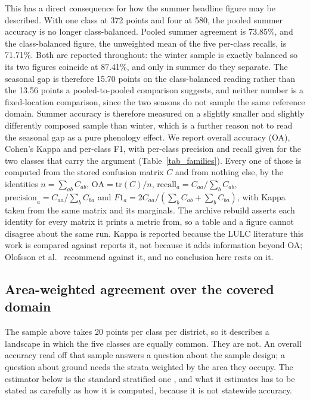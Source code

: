 \documentclass[conference]{IEEEtran}
\begin{document}
This has a direct consequence for how the summer headline figure may be described. With one class at 372 points and four at 580, the pooled summer accuracy is no longer class-balanced. Pooled summer agreement is 73.85\%, and the class-balanced figure, the unweighted mean of the five per-class recalls, is 71.71\%. Both are reported throughout: the winter sample is exactly balanced so its two figures coincide at 87.41\%, and only in summer do they separate. The seasonal gap is therefore 15.70 points on the class-balanced reading rather than the 13.56 points a pooled-to-pooled comparison suggests, and neither number is a fixed-location comparison, since the two seasons do not sample the same reference domain. Summer accuracy is therefore measured on a slightly smaller and slightly differently composed sample than winter, which is a further reason not to read the seasonal gap as a pure phenology effect. 
We report overall accuracy (OA), Cohen's Kappa \cite{r28} and per-class F1, with per-class precision and recall given for the two classes that carry the argument (Table~\ref{tab_families}). Every one of those is computed from the stored confusion matrix $C$ and from nothing else, by the identities $n=\sum_{ab} C_{ab}$, $\mathrm{OA}=\mathrm{tr}(C)/n$, $\mathrm{recall}_a = C_{aa}/\sum_b C_{ab}$, $\mathrm{precision}_a = C_{aa}/\sum_b C_{ba}$ and $F1_a = 2C_{aa}/(\sum_b C_{ab} + \sum_b C_{ba})$, with Kappa taken from the same matrix and its marginals. The archive rebuild asserts each identity for every matrix it prints a metric from, so a table and a figure cannot disagree about the same run. Kappa is reported because the LULC literature this work is compared against reports it, not because it adds information beyond OA; Olofsson et al.\ \cite{r17} recommend against it, and no conclusion here rests on it.

\subsection{Area-weighted agreement over the covered domain}
\label{sec:area}
The sample above takes 20 points per class per district, so it describes a landscape in which the five classes are equally common. They are not. An overall accuracy read off that sample answers a question about the sample design; a question about ground needs the strata weighted by the area they occupy. The estimator below is the standard stratified one \cite{r17}, and what it estimates has to be stated as carefully as how it is computed, because it is not statewide accuracy.
\end{document}
